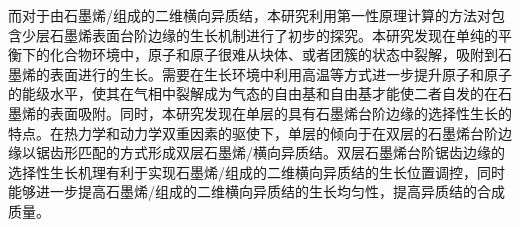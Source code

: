     而对于由石墨烯/组成的二维横向异质结，本研究利用第一性原理计算的方法对包含少层石墨烯表面台阶边缘的生长机制进行了初步的探究。本研究发现在单纯的平衡下的化合物环境中，原子和原子很难从块体、或者团簇的状态中裂解，吸附到石墨烯的表面进行的生长。需要在生长环境中利用高温等方式进一步提升原子和原子的能级水平，使其在气相中裂解成为气态的自由基和自由基才能使二者自发的在石墨烯的表面吸附。同时，本研究发现在单层的具有石墨烯台阶边缘的选择性生长的特点。在热力学和动力学双重因素的驱使下，单层的倾向于在双层的石墨烯台阶边缘以锯齿形匹配的方式形成双层石墨烯/横向异质结。双层石墨烯台阶锯齿边缘的选择性生长机理有利于实现石墨烯/组成的二维横向异质结的生长位置调控，同时能够进一步提高石墨烯/组成的二维横向异质结的生长均匀性，提高异质结的合成质量。
